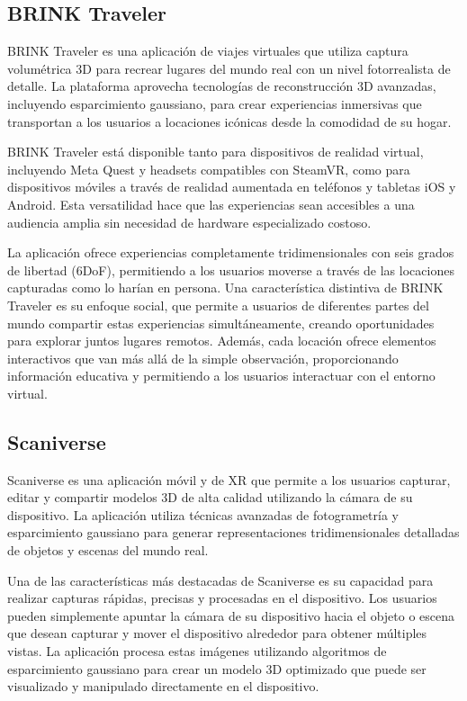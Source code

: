 \documentclass[lettersize,journal]{IEEEtran}
\begin{document}
\subsection{BRINK Traveler}

BRINK Traveler \cite{BrinkXR} es una aplicación de viajes virtuales que utiliza captura volumétrica 3D para recrear lugares del mundo real con un nivel fotorrealista de detalle. La plataforma aprovecha tecnologías de reconstrucción 3D avanzadas, incluyendo esparcimiento gaussiano, para crear experiencias inmersivas que transportan a los usuarios a locaciones icónicas desde la comodidad de su hogar.

BRINK Traveler está disponible tanto para dispositivos de realidad virtual, incluyendo Meta Quest y headsets compatibles con SteamVR, como para dispositivos móviles a través de realidad aumentada en teléfonos y tabletas iOS y Android. Esta versatilidad hace que las experiencias sean accesibles a una audiencia amplia sin necesidad de hardware especializado costoso.

La aplicación ofrece experiencias completamente tridimensionales con seis grados de libertad (6DoF), permitiendo a los usuarios moverse a través de las locaciones capturadas como lo harían en persona. Una característica distintiva de BRINK Traveler es su enfoque social, que permite a usuarios de diferentes partes del mundo compartir estas experiencias simultáneamente, creando oportunidades para explorar juntos lugares remotos. Además, cada locación ofrece elementos interactivos que van más allá de la simple observación, proporcionando información educativa y permitiendo a los usuarios interactuar con el entorno virtual.

\subsection{Scaniverse}

Scaniverse \cite{Scaniverse} es una aplicación móvil y de XR que permite a los usuarios capturar, editar y compartir modelos 3D de alta calidad utilizando la cámara de su dispositivo. La aplicación utiliza técnicas avanzadas de fotogrametría y esparcimiento gaussiano para generar representaciones tridimensionales detalladas de objetos y escenas del mundo real. 

Una de las características más destacadas de Scaniverse es su capacidad para realizar capturas rápidas, precisas y procesadas en el dispositivo. Los usuarios pueden simplemente apuntar la cámara de su dispositivo hacia el objeto o escena que desean capturar y mover el dispositivo alrededor para obtener múltiples vistas. La aplicación procesa estas imágenes utilizando algoritmos de esparcimiento gaussiano para crear un modelo 3D optimizado que puede ser visualizado y manipulado directamente en el dispositivo.
\end{document}
